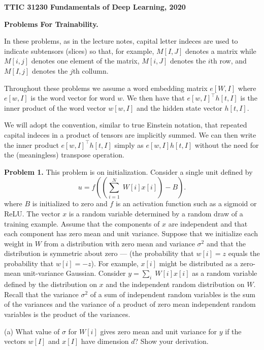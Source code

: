 \documentclass{article}
\newcommand{\solution}[1]{}
\begin{document}
\centerline{\bf TTIC 31230 Fundamentals of Deep Learning, 2020}
\medskip
\centerline{\bf Problems For Trainability.}

\bigskip

In these problems, as in the lecture notes, capital letter indeces are used to indicate subtensors (slices) so that, for example,  $M[I,J]$ denotes a matrix
while $M[i,j]$ denotes one element of the matrix, $M[i,J]$ denotes the $i$th row, and $M[I,j]$ denotes the $j$th collumn.

\medskip
Throughout these problems we assume a word embedding matrix $e[W,I]$ where $e[w,I]$ is the word vector for word $w$. We then have that $e[w,I]^\top h[t,I]$
is the inner product of the word vector $w[w,I]$ and the hidden state vector $h[t,I]$.

\medskip
We will adopt the convention, similar to true Einstein notation, that repeated capital indeces in a product of tensors are implicitly summed.  We can then write
the inner product $e[w,I]^\top h[t,I]$ simply as $e[w,I]h[t,I]$ without the need for the (meaningless) transpose operation.

\bigskip
{\bf Problem 1.}  This problem is on initialization.  Consider a single unit defined by
$$u = f\left(\left(\sum_{i=1}^N\;W[i]x[i]\right) - B\right).$$
where $B$ is initialized to zero and $f$ is an activation function such as a sigmoid or ReLU.
The vector $x$ is a random variable determined by a random draw of a training example.
Assume that the components of $x$ are independent and that each component has zero mean and unit variance.
Suppose that we initialize each weight in $W$ from a distribution with
zero mean and variance $\sigma^2$ and that the distribution is symmetric about zero --- (the probability that $w[i] = z$ equals the probability that $w[i] = -z$).
For example, $x[i]$ might be distributed as a zero-mean unit-variance Gaussian.
Consider $y = \sum_i\;W[i]x[i]$ as a random variable defined by the distribution on $x$ and the independent random distribution on $W$.
Recall that the variance $\sigma^2$ of
a sum of independent random variables is the sum of the variances and the variance of a product of zero mean independent
random variables is the product of the variances.

\medskip
(a) What value of $\sigma$ for $W[i]$ gives zero mean and unit variance for $y$ if the vectors $w[I]$ and $x[I]$ have dimension $d$?  Show your derivation.

\solution{Let $\sigma^2$ be the variance of $x[i]$.  We then have that the variance of $\sum_i W[i]x[i]$ is $\sum_i \sigma^2 = d \sigma^2$.
  Setting $d\sigma^2$ equal to 1 gives
  $$\sigma = \frac{1}{\sqrt{d}}$$
}
\end{document}
